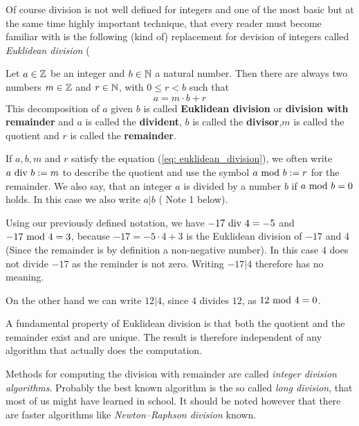 Of course division is not well defined for integers and one of the most basic but at the same time highly important technique, that every reader must become familiar with is the following (kind of) replacement for devision of integers called \textit{Euklidean division} (\cite{AL}
\begin{theorem}
Let $ a \in \mathbb{Z} $ be an integer and $ b \in \mathbb{N} $ a natural number. Then there are always two numbers $ m \in \mathbb{Z} $ and $ r \in \mathbb{N} $, with $ 0 \leq r <b $ such that
\begin{equation}
\label{eq: euklidean_division}
a = m \cdot b + r
\end{equation}
This decomposition of $a$ given $b$ is called \textbf{Euklidean division} or \textbf{division with remainder} and $ a $ is called the \textbf{divident}, $ b $ is called the \textbf{divisor},$m$ is called the quotient and $r$ is called the \textbf{remainder}. 
\end{theorem}
\begin{remark}
\label{eq: euklidean_division_notation}
If $ a, b, m $ and $ r $ satisfy the equation (\ref{eq: euklidean_division}), we often write $ a \text{ div } b: = m $ to describe the quotient and use the symbol $ a \text{ mod } b: = r $ for the remainder. We also say, that an integer $ a $ is divided by a number $ b $ if $ a \text{ mod } b = 0 $ holds. In this case we also write $ a | b $ (\cite{AL} Note 1 below).
\end{remark}
\begin{example}
Using our previously defined notation, we have $ -17 \text{ div } 4 = - 5 $ and $ -17 \text{ mod } 4 = 3 $, because $ -17 = -5 \cdot 4 + 3 $  is the Euklidean division of $-17$ and $4$ (Since the remainder is by definition a non-negative number). In this case $4$ does not divide $-17$ as the reminder is not zero. Writing $-17 | 4$ therefore has no meaning.

On the other hand we can write $12 | 4$, since $4$ divides $12$, as $ 12 \text{ mod } 4 = 0 $.
\end{example}
A fundamental property of Euklidean division is that both the quotient and the remainder exist and are unique. The result is therefore independent of any algorithm that actually does the computation.

Methods for computing the division with remainder are called \textit{integer division algorithms}. Probably the best known algorithm is the so called \textit{long division}, that most of us might have learned in school. It should be noted however that there are faster algorithms like \textit{Newton–Raphson division} known.

